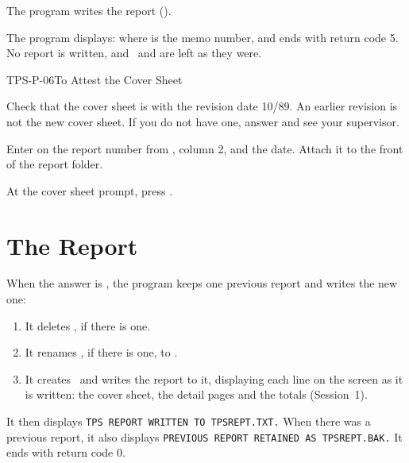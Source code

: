 The program writes the report ().

The program displays:
where  is the memo number, and ends with return code 5.  No report is
written, and \rpt\ and  are left as they were.

\begin{Procedure}{TPS-P-06}{To Attest the Cover Sheet}
\begin{ProcSteps}
\item Check that the cover sheet is  with the revision date 10/89.
  An earlier revision is not the new cover sheet.  If you do not have one,
  answer  and see your supervisor.
\item Enter on  the report number from , column 2, and the
  date.  Attach it to the front of the report folder.
\item At the cover sheet prompt, press .
\end{ProcSteps}
\end{Procedure}


\section{The Report}
When the answer is , the program keeps one previous report and
writes the new one:
\begin{enumerate}
\item It deletes , if there is one.
\item It renames \rpt, if there is one, to .
\item It creates \rpt\ and writes the report to it, displaying each line on
  the screen as it is written: the cover sheet, the detail pages and the
  totals (Session~1).
\end{enumerate}
It then displays \texttt{TPS REPORT WRITTEN TO TPSREPT.TXT.}  When there was
a previous report, it also displays \texttt{PREVIOUS REPORT RETAINED AS
TPSREPT.BAK.}  It ends with return code 0.

